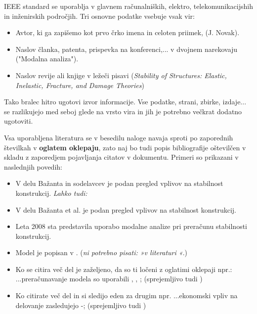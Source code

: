 IEEE standard se uporablja v glavnem računalniških, elektro, 
telekomunikacijshih in inženirskih področjih. Tri osnovne podatke vsebuje vsak 
vir:
\begin{itemize}
	\item Avtor, ki ga zapišemo kot prvo črko imena in celoten priimek, (J. 
	Novak).
	\item Naslov članka, patenta, prispevka na konferenci,...  v dvojnem 
	narekovaju ("Modalna analiza").
	\item Naslov revije ali knjige v ležeči pisavi (\emph{Stability of 
	Structures: Elastic, Inelastic, Fracture, and Damage Theories})
\end{itemize}
Tako bralec hitro ugotovi izvor informacije. Vse podatke, strani, zbirke, 
izdaje...  se razlikujejo med seboj glede na vrsto vira in jih je potrebno 
večkrat dodatno ugotoviti. 

Vsa uporabljena literatura se v besedilu naloge navaja sproti po zaporednih številkah v \textbf{oglatem oklepaju}, zato naj bo tudi popis bibliografije oštevilčen v skladu z zaporedjem pojavljanja citatov v dokumentu. Primeri so prikazani v naslednjih povedih:
\begin{itemize}
	\item V delu Bažanta in sodelavcev \cite{bazant_1991} je podan pregled 
	vplivov na stabilnost konstrukcij. \emph{Lahko tudi:}
	\item V delu Bažanta et al. \cite{bazant_1991} je podan pregled vplivov na
	stabilnost konstrukcij.
	\item Leta 2008 sta \citet{Bazant_2008} predstavila 
	uporabo modalne analize pri pre\-ra\-ču\-nu stabilnosti konstrukcij.
	\item Model je popisan v \cite{Doe_1991}. (\emph{ni potrebno pisati: »v 
	literaturi \cite{Doe_1991}«}.)
	\item Ko se citira več del je zaželjeno, da so ti ločeni z oglatimi 
	oklepaji npr.:  ...preračunavanje modela so uporabili \cite{bazant_1991}, 
	\cite{Doe_1991}, \cite{Bazant_2008}; (sprejemljivo tudi 
	\cite{bazant_1991,Doe_1991,Bazant_2008}) 
	\item Ko citirate več del in si sledijo eden za drugim npr. ...ekonomski 
	vpliv na delovanje zasledujejo \cite{bazant_1991}-\cite{Bazant_2008}; 
	(sprejemljivo tudi \cite{bazant_1991, stropnik_1997, 
	Doe_1991,Loukides_2020, Bazant_2008})
\end{itemize}

